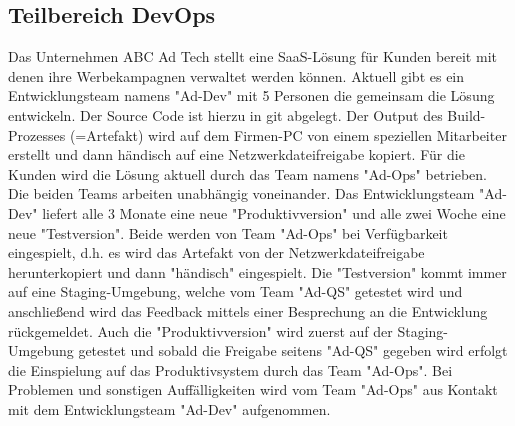 \subsection{Teilbereich DevOps}

Das Unternehmen ABC Ad Tech stellt eine SaaS-Lösung für Kunden bereit mit denen ihre
Werbekampagnen verwaltet werden können.
Aktuell gibt es ein Entwicklungsteam namens "Ad-Dev" mit 5 Personen die gemeinsam die
Lösung entwickeln. Der Source Code ist hierzu in git abgelegt. Der Output des Build-Prozesses
(=Artefakt) wird auf dem Firmen-PC von einem speziellen Mitarbeiter erstellt und dann
händisch auf eine Netzwerkdateifreigabe kopiert.
Für die Kunden wird die Lösung aktuell durch das Team namens "Ad-Ops" betrieben.
Die beiden Teams arbeiten unabhängig voneinander.
Das Entwicklungsteam "Ad-Dev" liefert alle 3 Monate eine neue "Produktivversion" und alle
zwei Woche eine neue "Testversion". Beide werden von Team "Ad-Ops" bei Verfügbarkeit
eingespielt, d.h. es wird das Artefakt von der Netzwerkdateifreigabe herunterkopiert und dann
"händisch" eingespielt. Die "Testversion" kommt immer auf eine Staging-Umgebung, welche
vom Team "Ad-QS" getestet wird und anschließend wird das Feedback mittels einer
Besprechung an die Entwicklung rückgemeldet. Auch die "Produktivversion" wird zuerst auf der
Staging-Umgebung getestet und sobald die Freigabe seitens "Ad-QS" gegeben wird erfolgt die
Einspielung auf das Produktivsystem durch das Team "Ad-Ops". Bei Problemen und sonstigen
Auffälligkeiten wird vom Team "Ad-Ops" aus Kontakt mit dem Entwicklungsteam "Ad-Dev"
aufgenommen.\\

